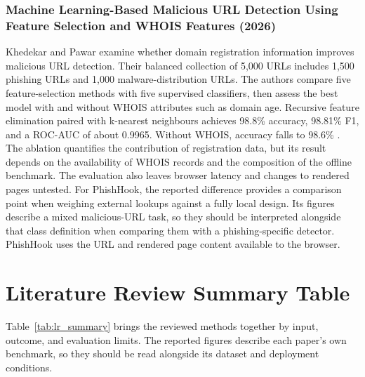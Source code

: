 \documentclass{FastFyp}
\begin{document}
\subsubsection{Machine Learning-Based Malicious URL Detection Using Feature Selection and WHOIS Features (2026)}
Khedekar and Pawar examine whether domain registration information improves malicious URL detection. Their balanced collection of 5,000 URLs includes 1,500 phishing URLs and 1,000 malware-distribution URLs. The authors compare five feature-selection methods with five supervised classifiers, then assess the best model with and without WHOIS attributes such as domain age. Recursive feature elimination paired with k-nearest neighbours achieves 98.8\% accuracy, 98.81\% F1, and a ROC-AUC of about 0.9965. Without WHOIS, accuracy falls to 98.6\% \cite{khedekar2026whoisurls}. The ablation quantifies the contribution of registration data, but its result depends on the availability of WHOIS records and the composition of the offline benchmark. The evaluation also leaves browser latency and changes to rendered pages untested. For PhishHook, the reported difference provides a comparison point when weighing external lookups against a fully local design. Its figures describe a mixed malicious-URL task, so they should be interpreted alongside that class definition when comparing them with a phishing-specific detector. PhishHook uses the URL and rendered page content available to the browser.

\section{Literature Review Summary Table}
\label{sec:lr-summary}
Table~\ref{tab:lr_summary} brings the reviewed methods together by input, outcome, and evaluation limits. The reported figures describe each paper's own benchmark, so they should be read alongside its dataset and deployment conditions.
\end{document}
